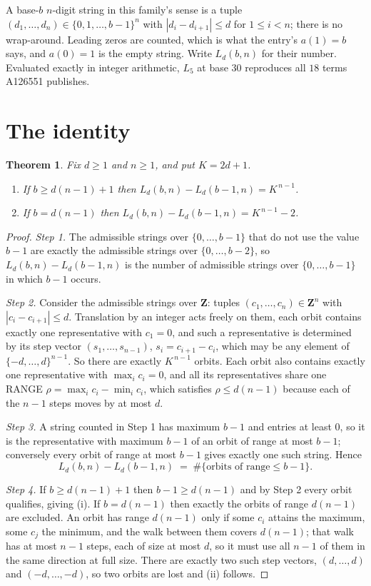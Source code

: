 \documentclass[11pt,a4paper]{article}
\theoremstyle{plain}
\newtheorem{theorem}{Theorem}
\theoremstyle{definition}
\begin{document}
A base-$b$ $n$-digit string in this family's sense is a tuple
$(d_1,\dots,d_n)\in\{0,1,\dots,b-1\}^{n}$ with $|d_i-d_{i+1}|\le d$ for $1\le i<n$; there
is no wrap-around. Leading zeros are counted, which is what the entry's $a(1)=b$ says, and
$a(0)=1$ is the empty string. Write $L_d(b,n)$ for their number. Evaluated exactly in integer
arithmetic, $L_{5}$ at base $30$ reproduces all $18$ terms A126551 publishes.

\section{The identity}

\begin{theorem}
Fix $d\ge1$ and $n\ge1$, and put $K=2d+1$.
\begin{enumerate}
\item[(i)] If $b\ge d(n-1)+1$ then $L_d(b,n)-L_d(b-1,n)=K^{\,n-1}$.
\item[(ii)] If $b=d(n-1)$ then $L_d(b,n)-L_d(b-1,n)=K^{\,n-1}-2$.
\end{enumerate}
\end{theorem}

\begin{proof}
\emph{Step 1.} The admissible strings over $\{0,\dots,b-1\}$ that do not use the value $b-1$
are exactly the admissible strings over $\{0,\dots,b-2\}$, so $L_d(b,n)-L_d(b-1,n)$ is the
number of admissible strings over $\{0,\dots,b-1\}$ in which $b-1$ occurs.

\emph{Step 2.} Consider the admissible strings over $\mathbf{Z}$: tuples
$(c_1,\dots,c_n)\in\mathbf{Z}^{n}$ with $|c_i-c_{i+1}|\le d$. Translation by an integer acts
freely on them, each orbit contains exactly one representative with $c_1=0$, and such a
representative is determined by its step vector $(s_1,\dots,s_{n-1})$, $s_i=c_{i+1}-c_i$,
which may be any element of $\{-d,\dots,d\}^{n-1}$. So there are exactly $K^{\,n-1}$ orbits.
Each orbit also contains exactly one representative with $\max_i c_i=0$, and all its
representatives share one RANGE $\rho=\max_ic_i-\min_ic_i$, which satisfies
$\rho\le d(n-1)$ because each of the $n-1$ steps moves by at most $d$.

\emph{Step 3.} A string counted in Step 1 has maximum $b-1$ and entries at least $0$, so it is
the representative with maximum $b-1$ of an orbit of range at most $b-1$; conversely every orbit
of range at most $b-1$ gives exactly one such string. Hence
\[
L_d(b,n)-L_d(b-1,n)\;=\;\#\{\text{orbits of range}\le b-1\} .
\]

\emph{Step 4.} If $b\ge d(n-1)+1$ then $b-1\ge d(n-1)$ and by Step 2 every orbit qualifies,
giving (i). If $b=d(n-1)$ then exactly the orbits of range $d(n-1)$ are excluded. An orbit has
range $d(n-1)$ only if some $c_i$ attains the maximum, some $c_j$ the minimum, and the walk
between them covers $d(n-1)$; that walk has at most $n-1$ steps, each of size at most $d$, so it
must use all $n-1$ of them in the same direction at full size. There are exactly two such step
vectors, $(d,\dots,d)$ and $(-d,\dots,-d)$, so two orbits are lost and (ii) follows.
\end{proof}
\end{document}
